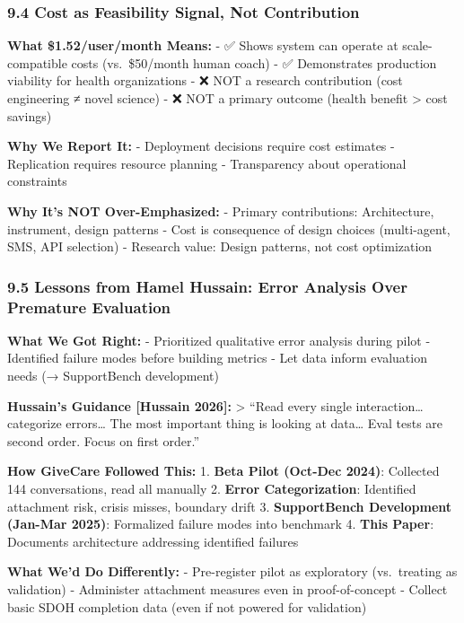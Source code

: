 \documentclass[
]{article}
\begin{document}
\subsubsection{9.4 Cost as Feasibility Signal, Not
Contribution}\label{cost-as-feasibility-signal-not-contribution}

\textbf{What \$1.52/user/month Means:} - ✅ Shows system can operate at
scale-compatible costs (vs.~\$50/month human coach) - ✅ Demonstrates
production viability for health organizations - ❌ NOT a research
contribution (cost engineering ≠ novel science) - ❌ NOT a primary
outcome (health benefit \textgreater{} cost savings)

\textbf{Why We Report It:} - Deployment decisions require cost estimates
- Replication requires resource planning - Transparency about
operational constraints

\textbf{Why It's NOT Over-Emphasized:} - Primary contributions:
Architecture, instrument, design patterns - Cost is consequence of
design choices (multi-agent, SMS, API selection) - Research value:
Design patterns, not cost optimization

\subsubsection{9.5 Lessons from Hamel Hussain: Error Analysis Over
Premature
Evaluation}\label{lessons-from-hamel-hussain-error-analysis-over-premature-evaluation}

\textbf{What We Got Right:} - Prioritized qualitative error analysis
during pilot - Identified failure modes before building metrics - Let
data inform evaluation needs (→ SupportBench development)

\textbf{Hussain's Guidance {[}Hussain 2026{]}:} \textgreater{} ``Read
every single interaction\ldots{} categorize errors\ldots{} The most
important thing is looking at data\ldots{} Eval tests are second order.
Focus on first order.''

\textbf{How GiveCare Followed This:} 1. \textbf{Beta Pilot (Oct-Dec
2024)}: Collected 144 conversations, read all manually 2. \textbf{Error
Categorization}: Identified attachment risk, crisis misses, boundary
drift 3. \textbf{SupportBench Development (Jan-Mar 2025)}: Formalized
failure modes into benchmark 4. \textbf{This Paper}: Documents
architecture addressing identified failures

\textbf{What We'd Do Differently:} - Pre-register pilot as exploratory
(vs.~treating as validation) - Administer attachment measures even in
proof-of-concept - Collect basic SDOH completion data (even if not
powered for validation)
\end{document}
